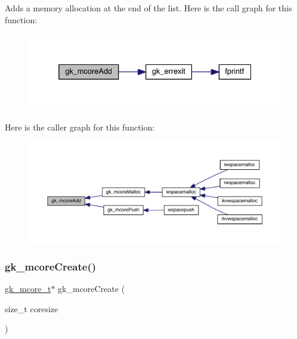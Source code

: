 Adds a memory allocation at the end of the list. Here is the call graph for this function\+:\nopagebreak
\begin{figure}[H]
\begin{center}
\leavevmode
\includegraphics[width=332pt]{a00077_a366348b623d380f773e5946011e14059_cgraph}
\end{center}
\end{figure}
Here is the caller graph for this function\+:\nopagebreak
\begin{figure}[H]
\begin{center}
\leavevmode
\includegraphics[width=350pt]{a00077_a366348b623d380f773e5946011e14059_icgraph}
\end{center}
\end{figure}
\mbox{\label{a00077_aba5df0f5155d88c0331fd6c996b483ed}} 
\subsubsection{\texorpdfstring{gk\+\_\+mcore\+Create()}{gk\_mcoreCreate()}}
{\footnotesize\ttfamily \hyperlink{a00682}{gk\+\_\+mcore\+\_\+t}$\ast$ gk\+\_\+mcore\+Create (\begin{DoxyParamCaption}\item[{size\+\_\+t}]{coresize }\end{DoxyParamCaption})}

